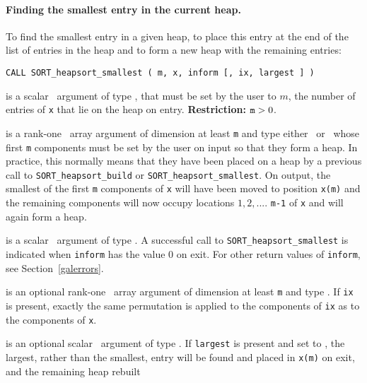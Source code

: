 \documentclass{galahad}
\newcommand{\packagename}{SORT}
\begin{document}

\paragraph{Finding the smallest entry in the current heap.}

To find the smallest entry in a given heap,
to place this entry at the end of the list of entries in the heap and
to form a new heap with the remaining entries:

\hspace{8mm}
{\tt CALL \packagename\_heapsort\_smallest ( m, x, inform [, ix, largest ] )}

\vspace*{-3mm}
\begin{description}
 is a scalar \intentin\ argument of type
\integer, that must be set by the user to $m$, the
number of entries of {\tt x} that lie on the heap on entry.
{\bf Restriction:} ${\tt m} > 0$.

 is a rank-one \intentinout\ array argument of
dimension at least {\tt m} and type either
\integer\ or \realdp\, whose first {\tt m} components must be set by
the user on input so that they form a heap.
In practice, this normally means that they have been placed on a heap
by a previous call to
{\tt \packagename\_heapsort\_build}
or
{\tt \packagename\_heapsort\_smallest}.
On output, the smallest of the first {\tt m} components of {\tt x} will have
been moved to position {\tt x(m)} and the remaining components will now occupy
locations $1,  2,  .... $ {\tt m-1} of {\tt x} and will again form a heap.

 is a scalar \intentout\ argument of type \integer.
A successful call to {\tt \packagename\_heapsort\_smallest}
is indicated when {\tt inform} has the value 0 on exit.
For other return values of {\tt inform}, see Section~\ref{galerrors}.

 is an optional rank-one \intentinout\ array argument of
dimension at least {\tt m} and type \integer.
If {\tt ix} is present, exactly the same permutation is applied to the
components of {\tt ix} as to the components of {\tt x}.

 is an optional scalar \intentin\ argument
of type \integer.
If {\tt largest} is present and set to \true, the largest, rather than the
smallest, entry will be found and placed in {\tt x(m)} on exit, and
the remaining heap rebuilt

\end{description}
\end{document}
